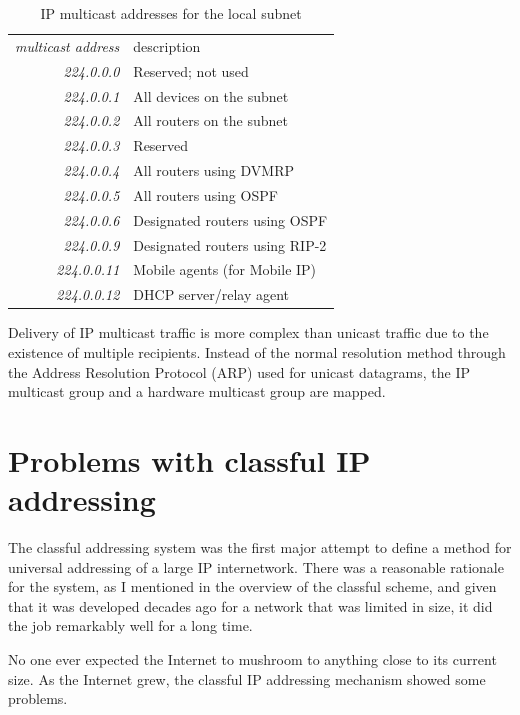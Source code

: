 \begin{table}
   \centering
   \begin{tabular}{rl}
   \emph{multicast address} & description\\[1ex]
   \textit{224.0.0.0}       & Reserved; not used\\
   \textit{224.0.0.1}       & All devices on the subnet\\
   \textit{224.0.0.2}       & All routers on the subnet\\
   \textit{224.0.0.3}       & Reserved\\
   \textit{224.0.0.4}       & All routers using DVMRP\\
   \textit{224.0.0.5}       & All routers using OSPF\\
   \textit{224.0.0.6}       & Designated routers using OSPF\\
   \textit{224.0.0.9}       & Designated routers using RIP-2\\
   \textit{224.0.0.11}      & Mobile agents (for Mobile IP)\\
   \textit{224.0.0.12}      & DHCP server/relay agent\\
   \end{tabular}
   \caption{IP multicast addresses for the local subnet}
   \label{tab:link-local-multicast}
\end{table}

Delivery of IP multicast traffic is more complex than unicast traffic due to the existence of multiple recipients.
Instead of the normal resolution method through the Address Resolution Protocol (ARP) used for unicast datagrams, the IP multicast group and a hardware multicast group are mapped.




\section{Problems with classful IP addressing}

The classful addressing system was the first major attempt to define a
method for universal addressing of a large IP internetwork. There was a
reasonable rationale for the system, as I mentioned in the overview of
the classful scheme, and given that it was developed decades ago for a
network that was limited in size, it did the job remarkably well for a
long time.

No one ever expected the Internet to mushroom to anything close to its
current size. As the Internet grew, the classful IP addressing mechanism
showed some problems.

